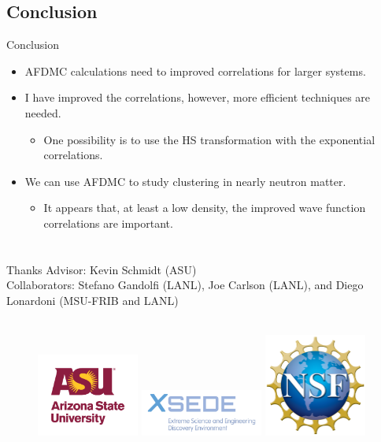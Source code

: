 \documentclass{beamer}
\begin{document}
\subsection{Conclusion}
\begin{frame}{Conclusion}
\begin{itemize}
   \item AFDMC calculations need to improved correlations for larger systems.
   \item I have improved the correlations, however, more efficient techniques are needed.
   \begin{itemize}
      \item One possibility is to use the HS transformation with the exponential correlations.
   \end{itemize}
   \item We can use AFDMC to study clustering in nearly neutron matter.
   \begin{itemize}
      \item It appears that, at least a low density, the improved wave function correlations are important.
   \end{itemize}
\end{itemize}
\end{frame}

\section{}
\begin{frame}{Thanks}
Advisor: Kevin Schmidt (ASU) \\
Collaborators: Stefano Gandolfi (LANL), Joe Carlson (LANL), and Diego Lonardoni (MSU-FRIB and LANL) 
\\~\\
\begin{figure}[h]
   \centering
   \includegraphics[width=0.30\textwidth]{../figures/asu_university_vert_rgb_maroongold_150.png}
   \includegraphics[width=0.36\textwidth]{../figures/xsede-full-color.jpg}
   \includegraphics[width=0.30\textwidth]{../figures/NSF_4-Color_bitmap_Logo.png}
\end{figure}
\end{frame}
\end{document}
